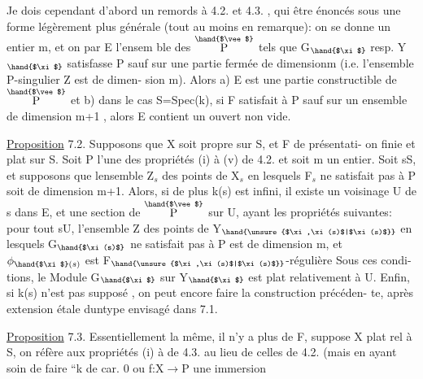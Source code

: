 
Je dois cependant d'abord  un remords à 4.2. et 4.3. , qui
 être énoncés sous une forme légèrement plus générale (tout au
moins en remarque): on se donne un entier m, et on  par E l'ensem
ble des \hand{$\xi\in$}$\overset{\hand{$\vee$}}{\text{P}}$ tels que G$_{\hand{$\xi$}}$ resp. Y$_{\hand{$\xi$}}$ satisfasse P sauf  sur une
partie fermée de dimension\hand{$\leq$}m (i.e. l'ensemble P-singulier Z est de dimen-%
sion\hand{$\leq$} m). Alors a) E est une partie constructible de $\overset{\hand{$\vee$}}{\text{P}}$ et b) dans le
cas S=Spec(k), si F  satisfait à P sauf  sur un ensemble de
dimension\hand{$\leq$} m+1 , alors E contient un ouvert non vide.

\uline{Proposition} 7.2. Supposons que X soit propre sur S, et F de présentati-%
on finie et plat sur S. Soit P l'une des propriétés (i) à (v) de 4.2.
et soit m un entier. Soit s\hand{$\in$}S, et supposons que 
 lensemble Z$_s$ des points de X$_s$ en lesquels F$_s$ ne satisfait
pas à P soit de dimension \hand{$\leq$} m+1. Alors, si de plus k(s) est infini, il
existe un voisinage U de s dans E, et une section \hand{$\xi$} de $\overset{\hand{$\vee$}}{\text{P}}$ sur U, ayant
les propriétés suivantes: pour tout s\hand{$\in$}U, l'ensemble Z des points
de  Y$_{\hand{\unsure{$\xi,\xi(s)$|$\xi(s)$}}}$ en lesquels G$_{\hand{$\xi(s)$}}$ ne satisfait pas à P est de dimension
\hand{$\leq$}m, et $\phi_{\hand{$\xi$}(s)}$ est F$_{\hand{\unsure{$\xi,\xi(s)$|$\xi(s)$}}}$-régulière\hand{,}  Sous ces condi-%
tions, le Module G$_{\hand{$\xi$}}$ sur Y$_{\hand{$\xi$}}$ est plat relativement à U. Enfin, si k(s)
n'est pas supposé , on peut encore faire la construction précéden-%
te, après extension étale duntype envisagé dans 7.1.

\uline{Proposition} 7.3. Essentiellement la même, il n'y a plus de F, 
suppose X plat rel à S, on réfère aux propriétés (i) à  de 4.3. au
lieu de celles de 4.2. (mais en ayant soin de faire  
``k de car. 0 ou f:X$\longrightarrow$P une immersion\hand{$\xi$}

